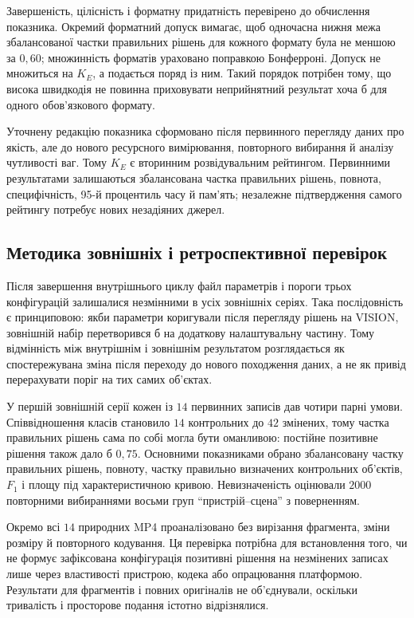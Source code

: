 Завершеність, цілісність і форматну придатність перевірено до обчислення показника. Окремий форматний допуск вимагає, щоб одночасна нижня межа збалансованої частки правильних рішень для кожного формату була не меншою за $0{,}60$; множинність форматів ураховано поправкою Бонферроні. Допуск не множиться на $K_E$, а подається поряд із ним. Такий порядок потрібен тому, що висока швидкодія не повинна приховувати неприйнятний результат хоча б для одного обов’язкового формату.

Уточнену редакцію показника сформовано після первинного перегляду даних про якість, але до нового ресурсного вимірювання, повторного вибирання й аналізу чутливості ваг. Тому $K_E$ є вторинним розвідувальним рейтингом. Первинними результатами залишаються збалансована частка правильних рішень, повнота, специфічність, 95-й процентиль часу й пам’ять; незалежне підтвердження самого рейтингу потребує нових незадіяних джерел.

\subsection{Методика зовнішніх і ретроспективної перевірок}

Після завершення внутрішнього циклу файл параметрів і пороги трьох конфігурацій залишалися незмінними в усіх зовнішніх серіях. Така послідовність є принциповою: якби параметри коригували після перегляду рішень на VISION, зовнішній набір перетворився б на додаткову налаштувальну частину. Тому відмінність між внутрішнім і зовнішнім результатом розглядається як спостережувана зміна після переходу до нового походження даних, а не як привід перерахувати поріг на тих самих об’єктах.

У першій зовнішній серії кожен із $14$ первинних записів дав чотири парні умови. Співвідношення класів становило $14$ контрольних до $42$ змінених, тому частка правильних рішень сама по собі могла бути оманливою: постійне позитивне рішення також дало б $0{,}75$. Основними показниками обрано збалансовану частку правильних рішень, повноту, частку правильно визначених контрольних об’єктів, $F_1$ і площу під характеристичною кривою. Невизначеність оцінювали $2000$ повторними вибираннями восьми груп ``пристрій--сцена'' з поверненням.

Окремо всі $14$ природних MP4 проаналізовано без вирізання фрагмента, зміни розміру й повторного кодування. Ця перевірка потрібна для встановлення того, чи не формує зафіксована конфігурація позитивні рішення на незмінених записах лише через властивості пристрою, кодека або опрацювання платформою. Результати для фрагментів і повних оригіналів не об’єднували, оскільки тривалість і просторове подання істотно відрізнялися.


